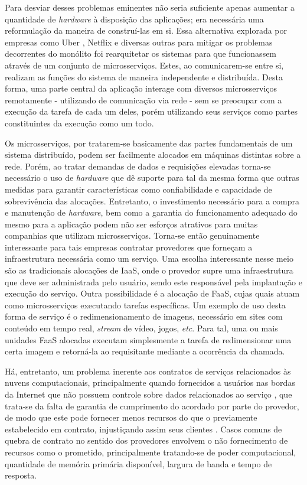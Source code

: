 %
Para desviar desses problemas eminentes não seria suficiente apenas aumentar a quantidade de \textit{hardware} à disposição das aplicações; era necessária uma reformulação da maneira de construí-las em si.
%
Essa alternativa explorada por empresas como Uber \cite{microsservicos:uber}, Netflix \cite{microsservicos:netflix} e diversas outras \cite{microsservicos:empresas} para mitigar os problemas decorrentes do monólito foi rearquitetar os sistemas para que funcionassem através de um conjunto de microsserviços.
%
Estes, ao comunicarem-se entre si, realizam as funções do sistema de maneira independente e distribuída. Desta forma, uma parte central da aplicação interage com diversos microsserviços remotamente - utilizando de comunicação via rede - sem se preocupar com a execução da tarefa de cada um deles, porém utilizando seus serviços como partes constituintes da execução como um todo.

%
Os microsserviços, por tratarem-se basicamente das partes fundamentais de um sistema distribuído, podem ser facilmente alocados em máquinas distintas sobre a rede.
%
Porém, ao tratar demandas de dados e requisições elevadas torna-se necessário o uso de \textit{hardware} que dê suporte para tal da mesma forma que outras medidas para garantir características como confiabilidade e capacidade de sobrevivência das alocações.
%
Entretanto, o investimento necessário para a compra e manutenção de \textit{hardware}, bem como a garantia do funcionamento adequado do mesmo para a aplicação podem não ser esforços atrativos para muitas companhias que utilizam microsserviços.
%
Torna-se então genuinamente interessante para tais empresas contratar provedores que forneçam a infraestrutura necessária como um serviço. Uma escolha interessante nesse meio são as tradicionais alocações de \ac{IaaS}, onde o provedor supre uma infraestrutura que deve ser administrada pelo usuário, sendo este responsável pela implantação e execução do serviço. Outra possibilidade é a alocação de \ac{FaaS}, cujas quais atuam como microsserviços executando tarefas específicas. Um exemplo de uso desta forma de serviço é o redimensionamento de imagens, necessário em sites com conteúdo em tempo real, \textit{stream} de vídeo, jogos, \textit{etc}. Para tal, uma ou mais unidades \ac{FaaS} alocadas executam simplesmente a tarefa de redimensionar uma certa imagem e retorná-la ao requisitante mediante a ocorrência da chamada. 

%
Há, entretanto, um problema inerente aos contratos de serviços relacionados às nuvens computacionais, principalmente quando fornecidos a usuários nas bordas da Internet que não possuem controle sobre dados relacionados ao serviço \cite{nuvem_sla:edge_computing}, que trata-se da falta de garantia de cumprimento do acordado por parte do provedor, de modo que este pode fornecer menos recursos do que o previamente estabelecido em contrato, injustiçando assim seus clientes \cite{nuvem_sla:violacaoSLA}. Casos comuns de quebra de contrato no sentido dos provedores envolvem o não fornecimento de recursos como o prometido, principalmente tratando-se de poder computacional, quantidade de memória primária disponível, largura de banda e tempo de resposta.

